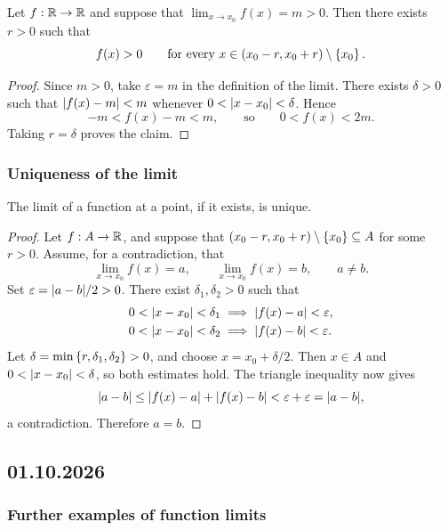 \documentclass[11pt,a4paper]{amsart}
\begin{document}
\begin{example}
  Let \(f:\mathbb{R}\to\mathbb{R}\) and suppose that
  \(\lim_{x\to x_0}f(x)=m>0\). Then there exists \(r>0\) such that
  \[
    f(x)>0
    \qquad\text{for every }x\in(x_0-r,x_0+r)\setminus\left\lbrace x_0\right\rbrace.
  \]
\end{example}

\begin{proof}
  Since \(m>0\), take \(\varepsilon=m\) in the definition of the
  limit. There exists \(\delta>0\) such that
  \(\lvert f(x)-m\rvert<m\) whenever \(0<\lvert x-x_0\rvert<\delta\).
  Hence
  \[
    -m<f(x)-m<m,
    \qquad\text{so}\qquad 0<f(x)<2m.
  \]
  Taking \(r=\delta\) proves the claim.
\end{proof}

\subsubsection{Uniqueness of the limit}

\begin{theorem}
  The limit of a function at a point, if it exists, is unique.
\end{theorem}

\begin{proof}
  Let \(f:A\to\mathbb{R}\), and suppose that
  \((x_0-r,x_0+r)\setminus\left\lbrace x_0\right\rbrace\subseteq A\) for some \(r>0\).
  Assume, for a contradiction, that
  \[
    \lim_{x\to x_0}f(x)=a,
    \qquad \lim_{x\to x_0}f(x)=b,
    \qquad a\neq b.
  \]
  Set \(\varepsilon=\lvert a-b\rvert/2>0\). There exist
  \(\delta_1,\delta_2>0\) such that
  \begin{align*}
    0<\lvert x-x_0\rvert<\delta_1&\implies\lvert f(x)-a\rvert<\varepsilon,\\
    0<\lvert x-x_0\rvert<\delta_2&\implies\lvert f(x)-b\rvert<\varepsilon.
  \end{align*}
  Let \(\delta=\min\left\lbrace r,\delta_1,\delta_2\right\rbrace>0\), and choose
  \(x=x_0+\delta/2\). Then \(x\in A\) and
  \(0<\lvert x-x_0\rvert<\delta\), so both estimates hold. The triangle
  inequality now gives
  \[
    \lvert a-b\rvert\leq\lvert f(x)-a\rvert+\lvert f(x)-b\rvert
    <\varepsilon+\varepsilon=\lvert a-b\rvert,
  \]
  a contradiction. Therefore \(a=b\).
\end{proof}

\subsection{01.10.2026}

\subsubsection{Further examples of function limits}
\end{document}
